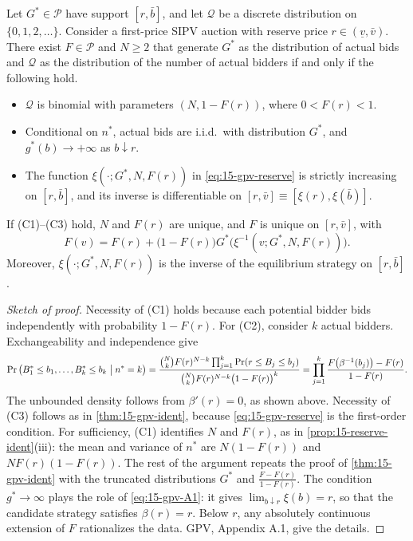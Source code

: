 \begin{theorem}\label{thm:15-gpv-reserve}
Let $G^*\in\mathcal P$ have support $[r,\bar b]$, and let $\mathcal Q$ be a discrete distribution on $\{0,1,2,\dots\}$. Consider a first-price SIPV auction with reserve price $r\in(\underline v,\bar v)$. There exist $F\in\mathcal P$ and $N\ge2$ that generate $G^*$ as the distribution of actual bids and $\mathcal Q$ as the distribution of the number of actual bidders if and only if the following hold.
\begin{itemize}
\item[(C1)] $\mathcal Q$ is binomial with parameters $(N,1-F(r))$, where $0<F(r)<1$.
\item[(C2)] Conditional on $n^*$, actual bids are i.i.d.\ with distribution $G^*$, and $g^*(b)\to+\infty$ as $b\downarrow r$.
\item[(C3)] The function $\xi(\cdot;G^*,N,F(r))$ in \eqref{eq:15-gpv-reserve} is strictly increasing on $[r,\bar b]$, and its inverse is differentiable on $[r,\bar v]\equiv[\xi(r),\xi(\bar b)]$.
\end{itemize}
If (C1)--(C3) hold, $N$ and $F(r)$ are unique, and $F$ is unique on $[r,\bar v]$, with
\[
F(v)=F(r)+\big(1-F(r)\big)G^*\big(\xi^{-1}(v;G^*,N,F(r))\big).
\]
Moreover, $\xi(\cdot;G^*,N,F(r))$ is the inverse of the equilibrium strategy on $[r,\bar b]$.
\end{theorem}

\begin{proof}[Sketch of proof]
Necessity of (C1) holds because each potential bidder bids independently with probability $1-F(r)$. For (C2), consider $k$ actual bidders. Exchangeability and independence give
\[
\Pr\big(B^*_1\le b_1,\dots,B^*_k\le b_k\bigm| n^*=k\big)=\frac{\binom Nk F(r)^{N-k}\prod_{j=1}^k\Pr(r\le B_j\le b_j)}{\binom Nk F(r)^{N-k}\big(1-F(r)\big)^k}=\prod_{j=1}^k\frac{F\big(\beta^{-1}(b_j)\big)-F(r)}{1-F(r)}.
\]
The unbounded density follows from $\beta'(r)=0$, as shown above. Necessity of (C3) follows as in \cref{thm:15-gpv-ident}, because \eqref{eq:15-gpv-reserve} is the first-order condition. For sufficiency, (C1) identifies $N$ and $F(r)$, as in \cref{prop:15-reserve-ident}(iii): the mean and variance of $n^*$ are $N(1-F(r))$ and $NF(r)(1-F(r))$. The rest of the argument repeats the proof of \cref{thm:15-gpv-ident} with the truncated distributions $G^*$ and $\frac{F-F(r)}{1-F(r)}$. The condition $g^*\to\infty$ plays the role of \eqref{eq:15-gpv-A1}: it gives $\lim_{b\downarrow r}\xi(b)=r$, so that the candidate strategy satisfies $\beta(r)=r$. Below $r$, any absolutely continuous extension of $F$ rationalizes the data. GPV, Appendix A.1, give the details.
\end{proof}

